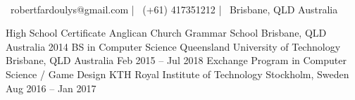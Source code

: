 \documentclass[]{awesome-cv}
\begin{document}
    
\begin{center}
	  \\
	\vspace{2mm}
	{\faEnvelope\ robertfardoulys@gmail.com} | {\faMobile\ (+61) 417351212} | {\faMapMarker\ Brisbane, QLD Australia}
\end{center}
\begin{cventries}
	\cventry
	{High School Certificate}
	{Anglican Church Grammar School}
	{Brisbane, QLD Australia}
	{2014}
	{}
	\cventry
	{BS in Computer Science}
	{Queensland University of Technology}
	{Brisbane, QLD Australia}
	{Feb 2015 – Jul 2018}
	{}
	\cventry
	{Exchange Program in Computer Science / Game Design}
	{KTH Royal Institute of Technology}
	{Stockholm, Sweden}
	{Aug 2016 – Jan 2017}
	{}
\end{cventries}
\end{document}
